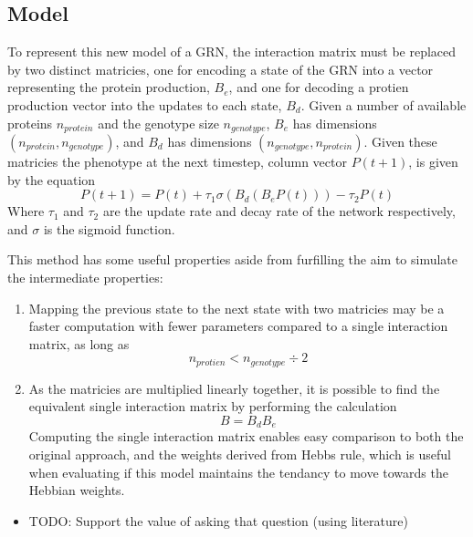 \documentclass[twocolumn,a4paper]{article}
\begin{document}
    \subsection{Model}
    To represent this new model of a GRN, the interaction matrix must be replaced by two distinct matricies, one for encoding a state of the GRN into a vector representing the protein production, $B_e$, and one for decoding a protien production vector into the updates to each state, $B_d$. Given a number of available proteins $n_{protein}$ and the genotype size $n_{genotype}$, $B_e$ has dimensions $(n_{protein},n_{genotype})$, and $B_d$ has dimensions $(n_{genotype},n_{protein})$. Given these matricies the phenotype at the next timestep, column vector $P(t+1)$, is given by the equation
    \begin{equation}
        P(t+1) = P(t) + \tau_1 \sigma (B_d (B_e P(t))) - \tau_2 P(t)
    \end{equation}
    Where $\tau_1$ and $\tau_2$ are the update rate and decay rate of the network respectively, and $\sigma$ is the sigmoid function.

    This method has some useful properties aside from furfilling the aim to simulate the intermediate properties:
    \begin{enumerate}
        \item Mapping the previous state to the next state with two matricies may be a faster computation with fewer parameters compared to a single interaction matrix, as long as
        \begin{equation}
            n_{protien} < n_{genotype} \div 2
        \end{equation}
            
        \item As the matricies are multiplied linearly together, it is possible to find the equivalent single interaction matrix by performing the calculation
        \begin{equation}
            B = B_dB_e
        \end{equation}
        Computing the single interaction matrix enables easy comparison to both the original approach, and the weights derived from Hebbs rule, which is useful when evaluating if this model maintains the tendancy to move towards the Hebbian weights.
    \end{enumerate}
    \begin{itemize}
        \item TODO: Support the value of asking that question (using literature)
    \end{itemize}
\end{document}
